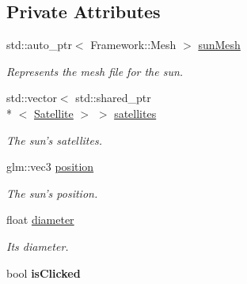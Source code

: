 \subsection*{Private Attributes}
\begin{DoxyCompactItemize}
\item 
\hypertarget{class_sun_a1aa72a3e0baeabd76642c48b969abf99}{std\-::auto\-\_\-ptr$<$ Framework\-::\-Mesh $>$ \hyperlink{class_sun_a1aa72a3e0baeabd76642c48b969abf99}{sun\-Mesh}}\label{class_sun_a1aa72a3e0baeabd76642c48b969abf99}

\begin{DoxyCompactList}\small\item\em Represents the mesh file for the sun. \end{DoxyCompactList}\item 
\hypertarget{class_sun_a03e54e773c82aabf5e3fad7b47241333}{std\-::vector$<$ std\-::shared\-\_\-ptr\\*
$<$ \hyperlink{class_satellite}{Satellite} $>$ $>$ \hyperlink{class_sun_a03e54e773c82aabf5e3fad7b47241333}{satellites}}\label{class_sun_a03e54e773c82aabf5e3fad7b47241333}

\begin{DoxyCompactList}\small\item\em The sun's satellites. \end{DoxyCompactList}\item 
\hypertarget{class_sun_acab91a34acacee79bb743089738da5cc}{glm\-::vec3 \hyperlink{class_sun_acab91a34acacee79bb743089738da5cc}{position}}\label{class_sun_acab91a34acacee79bb743089738da5cc}

\begin{DoxyCompactList}\small\item\em The sun's position. \end{DoxyCompactList}\item 
\hypertarget{class_sun_ac35fc9ebc427d9c8c9fd3ee3a12fce82}{float \hyperlink{class_sun_ac35fc9ebc427d9c8c9fd3ee3a12fce82}{diameter}}\label{class_sun_ac35fc9ebc427d9c8c9fd3ee3a12fce82}

\begin{DoxyCompactList}\small\item\em Its {\itshape diameter}. \end{DoxyCompactList}\item 
\hypertarget{class_sun_aa7d9c22a62eed3d761394d0acd87c5a3}{bool {\bfseries is\-Clicked}}\label{class_sun_aa7d9c22a62eed3d761394d0acd87c5a3}

\end{DoxyCompactItemize}


